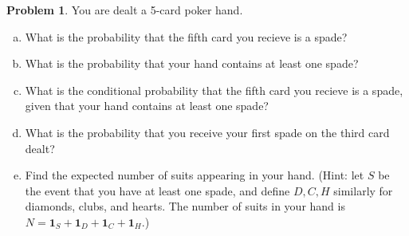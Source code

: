 \documentclass[10pt]{article}
\theoremstyle{definition}
\newtheorem{problem}[theorem]{Problem}
\newcommand{\1}[1]{\textbf{1}_{\left[#1\right]}} %
\begin{document}
\begin{problem}%
  You are dealt a 5-card poker hand.
  \begin{enumerate}[(a)]
    \item  What is the probability that the fifth
    card you recieve is a spade?
    \item What is the probability that your hand contains at least one spade?
    \item What is the conditional probability that the fifth card you recieve
    is a spade, given that your hand contains at least one spade?
    \item What is the probability that you receive your first spade on the
    third card dealt?
    \item Find the expected number of suits appearing in your hand. (Hint: let
    $S$ be the event that you have at least one spade, and define $D,C,H$
    similarly for diamonds, clubs, and hearts. The number of suits in your
    hand is $N=\mathbf{1}_{S}+\mathbf{1}_{D}+\mathbf{1}_{C}+\mathbf{1}_{H}$.)
  \end{enumerate}
\end{problem}
\end{document}
